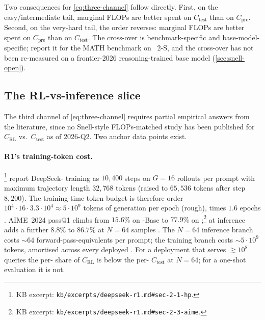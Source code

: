 Two consequences for \cref{eq:three-channel} follow directly. First,
on the easy/intermediate tail, marginal FLOPs are better spent on
$C_\text{test}$ than on $C_\text{pre}$. Second, on the very-hard tail,
the order reverses: marginal FLOPs are better spent on $C_\text{pre}$
than on $C_\text{test}$. The cross-over is benchmark-specific and
base-model-specific; \citet[\S 6]{snell2024} report it for the MATH
benchmark on ~2-S\*, and the cross-over has not been
re-measured on a frontier-2026 reasoning-trained base model
(\cref{sec:snell-open}).

\subsection{The RL-vs-inference slice}
\label{sec:svr-rl-vs-inference}

The third channel of \cref{eq:three-channel} requires partial
empirical answers from the  literature, since no Snell-style
FLOPs-matched study has been published for $C_\text{RL}$ vs.\
$C_\text{test}$ as of 2026-Q2. Two anchor data points exist.

\paragraph{R1's training-token cost.} \citet[\S 2.1]{deepseek-r1}%
\footnote{KB excerpt:
\texttt{kb/excerpts/deepseek-r1.md\#sec-2-1-hp}.} report
DeepSeek- training as $10{,}400$  steps on $G = 16$ rollouts
per prompt with maximum trajectory length $32{,}768$ tokens (raised to
$65{,}536$ tokens after step $8{,}200$). The training-time token
budget is therefore order $10^{4} \cdot 16 \cdot 3.3 \cdot 10^{4}
\approx 5 \cdot 10^{9}$ tokens of generation per epoch (rough), times
$1.6$ epochs \citep[\S 2.1]{deepseek-r1}. AIME~2024 pass@1 climbs from
$15.6\%$ on \glsterm{precision-pinning}{DeepSeek-V3}-Base to $77.9\%$ on 
\citep[\S 2.3]{deepseek-r1};\footnote{KB excerpt:
\texttt{kb/excerpts/deepseek-r1.md\#sec-2-3-aime}.} 
at inference adds a further $8.8\%$ to $86.7\%$ at $N = 64$ samples
\citep[\S 2.3]{deepseek-r1}. The $N = 64$ inference branch costs
$\sim 64$ forward-pass-equivalents per prompt; the  training
branch costs $\sim 5\cdot 10^{9}$ tokens, amortised across every
deployed . For a deployment that serves $\gtrsim 10^{8}$ queries
the per- share of $C_\text{RL}$ is below the per-\glsterm{query}{query}
$C_\text{test}$ at $N = 64$; for a one-shot evaluation it is not.

